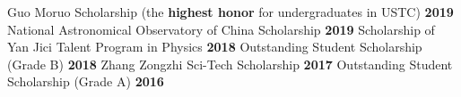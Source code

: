 
\begin{cventries}
  \cventry
    {}
    {Guo Moruo Scholarship \textnormal{(the \textbf{highest honor} for undergraduates in USTC)}}
    {\textcolor{awesome-emerald}{\textbf{2019}}}
    {}
    {}
\vspace{-0.7cm}
  \cventry
    {}
    {\textnormal{National Astronomical Observatory of China Scholarship}}
    {\textcolor{awesome-emerald}{\textbf{2019}}}
    {}
    {}
\vspace{-0.7cm}
  \cventry
    {}
    {\textnormal{Scholarship of Yan Jici Talent Program in Physics}}
    {\textcolor{awesome-emerald}{\textbf{2018}}}
    {}
    {}
\vspace{-0.7cm}
  \cventry
    {}
    {\textnormal{Outstanding Student Scholarship (Grade B)}}
    {\textcolor{awesome-emerald}{\textbf{2018}}}
    {}
    {}
\vspace{-0.7cm}
  \cventry
    {}
    {\textnormal{Zhang Zongzhi Sci-Tech Scholarship}}
    {\textcolor{awesome-emerald}{\textbf{2017}}}
    {}
    {}
\vspace{-0.7cm}
  \cventry
    {} %
    {\textnormal{Outstanding Student Scholarship (Grade A)}}
    {\textcolor{awesome-emerald}{\textbf{2016}}} %
    {} %
    {}
  \vspace{-1.2cm}
\end{cventries}